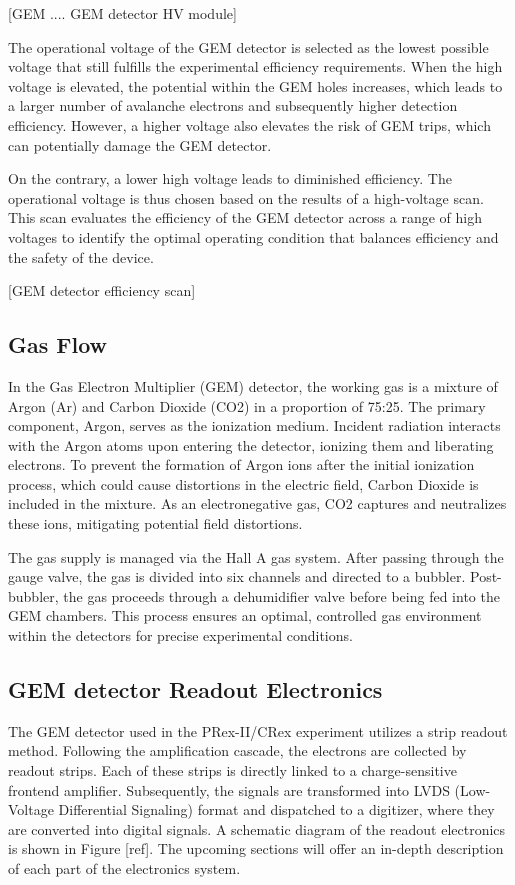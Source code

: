 [GEM .... GEM detector HV module]


The operational voltage of the GEM detector is selected as the lowest possible voltage that still fulfills the experimental efficiency requirements. When the high voltage is elevated, the potential within the GEM holes increases, which leads to a larger number of avalanche electrons and subsequently higher detection efficiency. However, a higher voltage also elevates the risk of GEM trips, which can potentially damage the GEM detector.

On the contrary, a lower high voltage leads to diminished efficiency. The operational voltage is thus chosen based on the results of a high-voltage scan. This scan evaluates the efficiency of the GEM detector across a range of high voltages to identify the optimal operating condition that balances efficiency and the safety of the device.

[GEM detector efficiency scan]

\subsection{Gas Flow}

In the Gas Electron Multiplier (GEM) detector, the working gas is a mixture of Argon (Ar) and Carbon Dioxide (CO2) in a proportion of 75:25. The primary component, Argon, serves as the ionization medium. Incident radiation interacts with the Argon atoms upon entering the detector, ionizing them and liberating electrons. To prevent the formation of Argon ions after the initial ionization process, which could cause distortions in the electric field, Carbon Dioxide is included in the mixture. As an electronegative gas, CO2 captures and neutralizes these ions, mitigating potential field distortions.

The gas supply is managed via the Hall A gas system. After passing through the gauge valve, the gas is divided into six channels and directed to a bubbler. Post-bubbler, the gas proceeds through a dehumidifier valve before being fed into the GEM chambers. This process ensures an optimal, controlled gas environment within the detectors for precise experimental conditions.

\subsection{GEM detector Readout Electronics}

The GEM detector used in the PRex-II/CRex experiment utilizes a strip readout method. Following the amplification cascade, the electrons are collected by readout strips. Each of these strips is directly linked to a charge-sensitive frontend amplifier. Subsequently, the signals are transformed into LVDS (Low-Voltage Differential Signaling) format and dispatched to a digitizer, where they are converted into digital signals. A schematic diagram of the readout electronics is shown in Figure [ref]. The upcoming sections will offer an in-depth description of each part of the electronics system.

